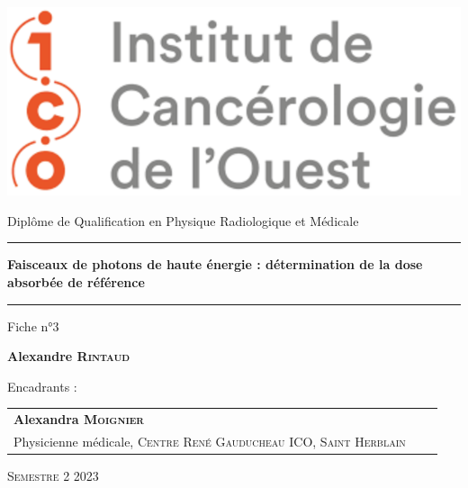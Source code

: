 \begin{titlepage}

    \unitlength 1cm
    \begin{center}
    
    \vspace*{1cm}

    \includegraphics[scale=0.6]{figures/logo_ico.png}
    
    \vspace{2cm}
    
               {\Large Diplôme de Qualification en Physique Radiologique et Médicale\\}
               
    \vspace{2cm}           
    
    
    \rule{16cm}{0.7pt}
    
    \vspace{12pt}
               
               {\LARGE \bf Faisceaux de photons de haute énergie : détermination de la dose absorbée de référence\\}
               
    \vspace{12pt}
    \rule{16cm}{0.7pt}

    \vspace{2cm}

                {\large Fiche n°3}
    
    \vspace{1.5cm}

               {\Large\bf {Alexandre \textsc{Rintaud}}}
    
    \vspace{1.5cm}
    
    \end{center}
    
    Encadrants :
    
    \small {
    \begin{tabular}{llr}\\
    \textbf{Alexandra \textsc{Moignier}}   &  &  \\
      Physicienne médicale, \textsc{Centre René Gauducheau ICO, Saint Herblain} &    &  \\
    
    \end{tabular}
    }

    \vspace{1.5cm}


    \begin{center}
    \textsc{Semestre 2 2023}
    \end{center}
    
\end{titlepage}
\let\cleardoublepage\clearpage
